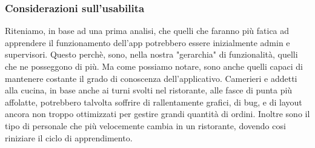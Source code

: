     \subsubsection*{Considerazioni sull'usabilita}
        \begin{flushleft}
            Riteniamo, in base ad una prima analisi, che quelli che faranno più fatica ad apprendere il funzionamento dell'app potrebbero essere inizialmente admin e supervisori.
            Questo perchè, sono, nella nostra "gerarchia" di funzionalità, quelli che ne posseggono di più. 
            Ma come possiamo notare, sono anche quelli capaci di mantenere costante il grado di conoscenza dell'applicativo.
            Camerieri e addetti alla cucina, in base anche ai turni svolti nel ristorante, alle fasce di punta più affolatte, potrebbero talvolta
            soffrire di rallentamente grafici, di bug, e di layout ancora non troppo ottimizzati per gestire grandi quantità di ordini.
            Inoltre sono il tipo di personale che più velocemente cambia in un ristorante, dovendo cosi riniziare il ciclo di apprendimento.
        \end{flushleft}
